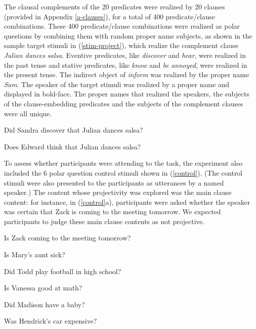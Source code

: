 \documentclass[11pt,fleqn]{article}
\newcommand{\6}{\mbox{$[\hspace*{-.6mm}[$}}
\newcommand{\9}{\mbox{$]\hspace*{-.6mm}]$}}
\begin{document}
The clausal complements of the 20 predicates were realized by 20 clauses (provided in Appendix \ref{a-clauses}), for a total of 400 predicate/clause combinations. These 400 predicate/clause combinations were realized as polar questions by combining them with random proper name subjects, as shown in the sample target stimuli in (\ref{stim-project}), which realize the complement clause {\em Julian dances salsa}. Eventive predicates, like {\em discover} and {\em hear}, were realized in the past tense and stative predicates, like {\em know} and {\em be annoyed}, were realized in the present tense. The indirect object of {\em inform} was realized by the proper name {\em Sam}.  The speaker of the target stimuli was realized by a proper name and displayed in bold-face. The proper names that realized the speakers, the subjects of the clause-embedding predicates and the subjects of the complement clauses were all unique.

\begin{exe}
\ex\label{stim-project} 
\begin{xlist}
 Did Sandra discover that Julian dances salsa?

 Does Edward think that Julian dances salsa?
\end{xlist}
\end{exe}

To assess whether participants were attending to the task, the experiment also included the 6  polar question control stimuli shown in (\ref{control}). (The control stimuli were also presented to the participants as utterances by a named speaker.) The content whose projectivity was explored was the main clause content: for instance, in (\ref{control}a), participants were asked whether the speaker was certain that Zack is coming to the meeting tomorrow. We expected participants to judge these main clause contents as not projective.

\begin{exe}
\ex\label{control} 
\begin{xlist}

\ex   Is Zack coming to the meeting tomorrow?

\ex Is Mary's aunt sick?

\ex Did Todd play football in high school?

\ex Is Vanessa good at math?

\ex Did Madison have a baby?

\ex Was Hendrick's car expensive?

\end{xlist}
\end{exe}
\end{document}
